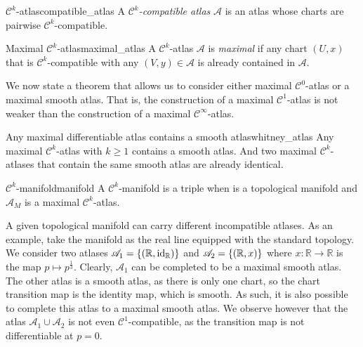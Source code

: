 \begin{definition}{\(\mathcal{C}^k\)-atlas}{compatible_atlas}
    A \emph{\(\mathcal{C}^k\)-compatible atlas} \(\mathscr{A}\) is an atlas whose charts are pairwise \(\mathcal{C}^k\)-compatible.
\end{definition}

\begin{definition}{Maximal \(\mathcal{C}^k\)-atlas}{maximal_atlas}
    A \(\mathcal{C}^k\)-atlas \(\mathscr{A}\) is \emph{maximal} if any chart \((U, x)\) that is \(\mathcal{C}^k\)-compatible with any \((V, y) \in \mathscr{A}\) is already contained in \(\mathscr{A}\).
\end{definition}

We now state a theorem \cite{hirsch} that allows us to consider either maximal \(\mathcal{C}^0\)-atlas or a maximal smooth atlas. That is, the construction of a maximal \(\mathcal{C}^1\)-atlas is not weaker than the construction of a maximal \(\mathcal{C}^\infty\)-atlas.
\begin{theorem}{Any maximal differentiable atlas contains a smooth atlas}{whitney_atlas}
    Any maximal \(\mathcal{C}^k\)-atlas with \(k \geq 1\) contains a smooth atlas. And two maximal \(\mathcal{C}^k\)-atlases that contain the same smooth atlas are already identical.
\end{theorem}

\begin{definition}{\(\mathcal{C}^k\)-manifold}{manifold}
    A \(\mathcal{C}^k\)-manifold is a triple  when  is a topological manifold and \(\mathscr{A}_M\) is a maximal \(\mathcal{C}^k\)-atlas.
\end{definition}

\begin{remark}
    A given topological manifold can carry different incompatible atlases. As an example, take the manifold as the real line equipped with the standard topology. We consider two atlases \(\mathscr{A}_1 = \{(\mathbb{R}, \mathrm{id}_{\mathbb{R}})\}\) and \(\mathscr{A}_2 = \{(\mathbb{R}, x)\}\) where \(x : \mathbb{R} \to \mathbb{R}\) is the map \(p \mapsto p^{\frac13}\). Clearly, \(\mathscr{A}_1\) can be completed to be a maximal smooth atlas. The other atlas is a smooth atlas, as there is only one chart, so the chart transition map is the identity map, which is smooth. As such, it is also possible to complete this atlas to a maximal smooth atlas. We observe however that the atlas \(\mathscr{A}_1 \cup \mathscr{A}_2\) is not even \(\mathcal{C}^1\)-compatible, as the transition map is not differentiable at \(p = 0\).
\end{remark}

